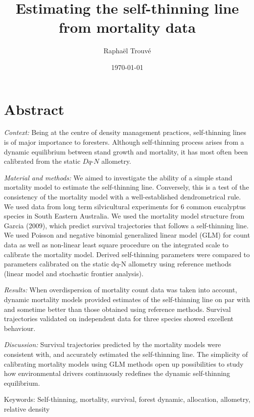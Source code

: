 \documentclass[12pt,english]{article}
\title{Estimating the self-thinning line from mortality data}
\author{Raphaël Trouvé}
\date{\today}
\begin{document}
\maketitle

\newpage
\doublespacing
\linenumbers

\section*{Abstract}
  \textit{Context:} Being at the centre of density management practices, self-thinning lines is of major importance to foresters. Although self-thinning process arises from a dynamic equilibrium between stand growth and mortality, it has most often been calibrated from the static $Dq$-$N$ allometry.   
   
  \textit{Material and methods:} We aimed to investigate the ability of a simple stand mortality model to estimate the self-thinning line. Conversely, this is a test of the consistency of the mortality model with a well-established dendrometrical rule. We used data from long term silvicultural experiments for 6 common eucalyptus species in South Eastern Australia. We used the mortality model structure from Garcia (2009), which predict survival trajectories that follows a self-thinning line. We used Poisson and negative binomial generalized linear model (GLM) for count data as well as non-linear least square procedure on the integrated scale to calibrate the mortality model. Derived self-thinning parameters were compared to parameters calibrated on the static dq-N allometry using reference methods (linear model and stochastic frontier analysis).  
  
  \textit{Results:} When overdispersion of mortality count data was taken into account, dynamic mortality models provided estimates of the self-thinning line on par with and sometime better than those obtained using reference methods. Survival trajectories validated on independent data for three species showed excellent behaviour.
  
  \textit{Discussion:} Survival trajectories predicted by the mortality models were consistent with, and accurately estimated the self-thinning line. The simplicity of calibrating mortality models using GLM methods open up possibilities to study how environmental drivers continuously redefines the dynamic self-thinning equilibrium.
  
\bigskip
\textsf{Keywords:} Self-thinning, mortality, survival, forest dynamic, allocation, allometry, relative density
\end{document}

